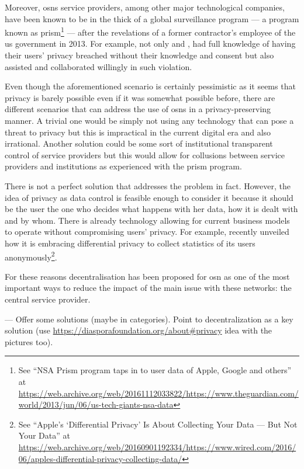 \documentclass[showtrims]{kthesis}
\begin{document}
Moreover, \acp{osn} service providers, among other major technological companies, 
have been known to be in the thick of a global surveillance program --- a program 
known as \Ac{prism}\footnote{See ``NSA Prism program taps in to user data of Apple, Google and others'' at \url{https://web.archive.org/web/20161112033822/https://www.theguardian.com/world/2013/jun/06/us-tech-giants-nsa-data}} --- 
after the revelations of a former contractor's employee of the \ac{us} government 
in 2013. For example, not only \Facebook and \Google, had full knowledge of having 
their users' privacy breached without their knowledge and consent but also assisted 
and collaborated willingly in such violation.

Even though the aforementioned scenario is certainly pessimistic as it seems that 
privacy is barely possible even if it was somewhat possible before, there are different 
scenarios that can address the use of \acp{osn} in a privacy-preserving manner. 
A trivial one would be simply not using any technology that can pose a threat to privacy 
but this is impractical in the current digital era and also irrational. Another 
solution could be some sort of institutional transparent control of service providers 
but this would allow for collusions between service providers and institutions as 
experienced with the \ac{prism} program.

There is not a perfect solution that addresses the problem in fact. However, the 
idea of privacy as data control is feasible enough to consider it because it should 
be the user the one who decides what happens with her data, how it is dealt with 
and by whom. There is already technology allowing for current business models to 
operate without compromising users' privacy. For example, \Apple recently unveiled 
how it is embracing differential privacy to collect statistics of its users anonymously\footnote{See ``Apple's `Differential Privacy' Is About Collecting Your Data --- But Not Your Data'' at \url{https://web.archive.org/web/20160901192334/https://www.wired.com/2016/06/apples-differential-privacy-collecting-data/}}.

For these reasons decentralisation has been proposed for \ac{osn} as one of the 
most important ways to reduce the impact of the main issue with these networks: 
the central service provider. 




---
Offer some solutions (maybe in categories). Point to decentralization as a key solution
(use \url{https://diasporafoundation.org/about#privacy} idea with the pictures too).
\end{document}
